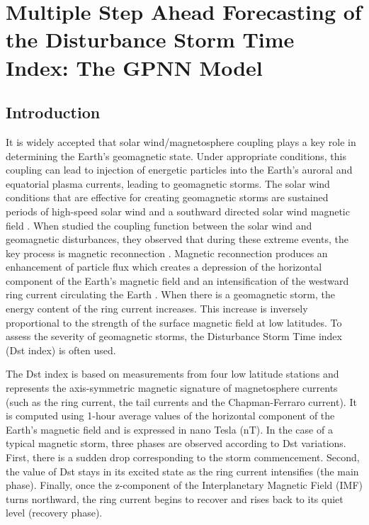 \chapter{Multiple Step Ahead Forecasting of the Disturbance Storm Time Index: The GPNN Model}\label{chapter:dst_msa}

\section{Introduction}

It is widely accepted that solar wind/magnetosphere coupling plays a key role in determining the Earth’s 
geomagnetic state. Under appropriate conditions, this coupling can lead to injection of energetic particles 
into the Earth’s auroral and equatorial plasma currents, leading to geomagnetic storms. The solar wind conditions 
that are effective for creating geomagnetic storms are sustained periods of high-speed solar wind and a southward 
directed solar wind magnetic field \citep{JGR:JGR10260}. When \citet{1981AkasofuE} studied the coupling function 
between the solar wind and geomagnetic disturbances, they observed that during these extreme events, the key process 
is magnetic reconnection \citep{magneticreconnection}. Magnetic reconnection produces an enhancement of particle flux 
which creates a depression of the horizontal component of the Earth’s magnetic field and an intensification of the 
westward ring current circulating the Earth \citep{JGRA:JGRA11775}. When there is a geomagnetic storm, the energy 
content of the ring current increases. This increase is inversely proportional to the strength of the surface magnetic 
field at low latitudes. To assess the severity of geomagnetic storms, the Disturbance Storm Time index (Dst index) is 
often used. 

The Dst index \citep{Sugiura1964} is based on measurements from four low latitude stations and 
represents the axis-symmetric magnetic signature of magnetosphere currents (such as the ring current, 
the tail currents and the Chapman-Ferraro current). It is computed using 1-hour average values of the 
horizontal component of the Earth’s magnetic field and is expressed in nano Tesla (nT). In the case of a 
typical magnetic storm, three phases are observed according to Dst variations. First, there is a sudden drop 
corresponding to the storm commencement. Second, the value of Dst stays in its excited state as the ring current 
intensifies (the main phase). Finally, once the z-component of the Interplanetary Magnetic Field (IMF) turns 
northward, the ring current begins to recover and rises back to its quiet level (recovery phase). 

